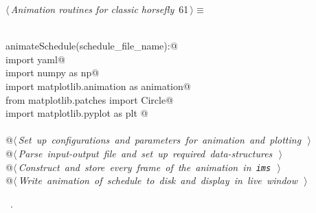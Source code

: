 \documentclass[11.5pt]{report}
\begin{document}
\begin{flushleft} \small
\begin{minipage}{\linewidth}\label{scrap93}\raggedright\small
{} $\langle\,${\itshape Animation routines for classic horsefly}\nobreak\ {\footnotesize {61}}$\,\rangle\equiv$
\vspace{-1ex}
\begin{list}{}{} \item
\mbox{}\verb@@\\
\mbox{}\verb@def animateSchedule(schedule_file_name):@\\
\mbox{}\verb@     import yaml@\\
\mbox{}\verb@     import numpy as np@\\
\mbox{}\verb@     import matplotlib.animation as animation@\\
\mbox{}\verb@     from matplotlib.patches import Circle@\\
\mbox{}\verb@     import matplotlib.pyplot as plt @\\
\mbox{}\verb@@\\
\mbox{}\verb@     @\hbox{$\langle\,${\itshape Set up configurations and parameters for animation and plotting}\nobreak\ {\footnotesize {}}$\,\rangle$}\verb@@\\
\mbox{}\verb@     @\hbox{$\langle\,${\itshape Parse input-output file and set up required data-structures}\nobreak\ {\footnotesize {}}$\,\rangle$}\verb@@\\
\mbox{}\verb@     @\hbox{$\langle\,${\itshape Construct and store every frame of the animation in \verb|ims|}\nobreak\ {\footnotesize {}}$\,\rangle$}\verb@@\\
\mbox{}\verb@     @\hbox{$\langle\,${\itshape Write animation of schedule to disk and display in live window}\nobreak\ {\footnotesize {}}$\,\rangle$}\verb@@\\
\mbox{}\verb@@{\NWsep}
\end{list}
\vspace{-1.5ex}
\footnotesize
\begin{list}{}{\setlength{\itemsep}{-\parsep}\setlength{\itemindent}{-\leftmargin}}
\item \NWtxtMacroRefIn\ .

\item{}
\end{list}
\end{minipage}\vspace{4ex}
\end{flushleft}
\end{document}
